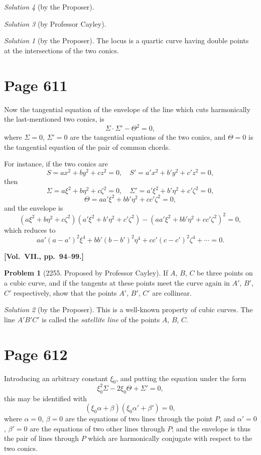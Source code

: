 \documentclass[12pt,a4paper]{article}
\theoremstyle{plain}
\theoremstyle{definition}
\newtheorem{problem}{Problem}
\theoremstyle{remark}
\newtheorem*{solution}{Solution}
\begin{document}
\begin{solution}[by the Proposer]
\begin{solution}[by Professor Cayley]
\begin{solution}[by the Proposer]
The locus is a quartic curve having double points at the intersections of the two conics.
\end{solution}

\section*{Page 611}
\setcounter{page}{611}

Now the tangential equation of the envelope of the line which cuts harmonically the last-mentioned two conics, is
\[
\Sigma \cdot \Sigma' - \Theta^2 = 0,
\]
where $\Sigma = 0$, $\Sigma' = 0$ are the tangential equations of the two conics, and $\Theta = 0$ is the tangential equation of the pair of common chords.

For instance, if the two conics are
\[
S = ax^2 + by^2 + cz^2 = 0, \quad
S' = a'x^2 + b'y^2 + c'z^2 = 0,
\]
then
\[
\Sigma = a\xi^2 + b\eta^2 + c\zeta^2 = 0, \quad
\Sigma' = a'\xi^2 + b'\eta^2 + c'\zeta^2 = 0,
\]
\[
\Theta = aa'\xi^2 + bb'\eta^2 + cc'\zeta^2 = 0,
\]
and the envelope is
\[
(a\xi^2 + b\eta^2 + c\zeta^2)(a'\xi^2 + b'\eta^2 + c'\zeta^2) - (aa'\xi^2 + bb'\eta^2 + cc'\zeta^2)^2 = 0,
\]
which reduces to
\[
aa'(a - a')^2\xi^4 + bb'(b - b')^2\eta^4 + cc'(c - c')^2\zeta^4 + \cdots = 0.
\]

\medskip\noindent\textbf{[Vol.~VII., pp.~94--99.]}

\begin{problem}[2255. Proposed by Professor Cayley]
If $A$, $B$, $C$ be three points on a cubic curve, and if the tangents at these points meet the curve again in $A'$, $B'$, $C'$ respectively, show that the points $A'$, $B'$, $C'$ are collinear.
\end{problem}

\begin{solution}[by the Proposer]
This is a well-known property of cubic curves. The line $A'B'C'$ is called the \textit{satellite line} of the points $A$, $B$, $C$.
\end{solution}

\section*{Page 612}
\setcounter{page}{612}

Introducing an arbitrary constant $\xi_0$, and putting the equation under the form
\[
\xi_0^2 \Sigma - 2\xi_0 \Theta + \Sigma' = 0,
\]
this may be identified with
\[
(\xi_0 \alpha + \beta)(\xi_0 \alpha' + \beta') = 0,
\]
where $\alpha = 0$, $\beta = 0$ are the equations of two lines through the point $P$, and $\alpha' = 0$, $\beta' = 0$ are the equations of two other lines through $P$; and the envelope is thus the pair of lines through $P$ which are harmonically conjugate with respect to the two conics.


\end{solution}
\end{solution}
\end{document}
